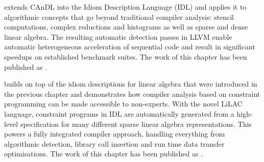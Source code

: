     {\bf{}} extends CAnDL into the Idiom Description Language
    (IDL) and applies it to algorithmic concepts that go beyond traditional
    compiler analysis: stencil computations, complex reductions and histograms
    as well as sparse and dense linear algebra.
    The resulting automatic detection passes in LLVM enable automatic
    heterogeneous acceleration of sequential code and result in significant
    speedups on established benchmark suites.
    The work of this chapter has been published as
    {\bf\citet{Ginsbach:2018:AML:3173162.3173182}}.

    {\bf{}} builds on top of the idiom descriptions for linear
    algebra that were introduced in the previous chapter and demonstrates how
    compiler analysis based on constraint programming can be made accessible to
    non-experts.
    With the novel LiLAC language, constraint programs in IDL are automatically
    generated from a high-level specification for many different sparse linear
    algebra representations.
    This powers a fully integrated compiler approach, handling everything from
    algorithmic detection, library call insertion and run time data transfer
    optimisations.
    The work of this chapter has been published as \citet{lilacpaper}.
